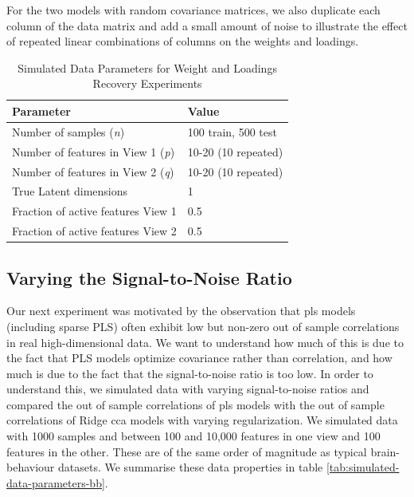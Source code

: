 For the two models with random covariance matrices, we also duplicate each column of the data matrix and add a small amount of noise to illustrate the effect of repeated linear combinations of columns on the weights and \gls{loadings}.

\begin{table}
    \centering
    \caption{Simulated Data Parameters for Weight and Loadings Recovery Experiments}
    \begin{tabular}{| l | l |}
        \hline
        \textbf{Parameter}                        & \textbf{Value}                               \\
        \hline
        Number of samples (\textit{n})            & 100 train, 500 test                            \\
        Number of features in View 1 (\textit{p}) & 10-20 (10 repeated) \\
        Number of features in View 2 (\textit{q}) & 10-20 (10 repeated) \\
        True Latent dimensions                    & 1                                            \\
        Fraction of active features View 1            & 0.5                                          \\
        Fraction of active features View 2            & 0.5                                          \\
        \hline
    \end{tabular}\label{tab:simulated-data-parameters}
\end{table}

\subsection{Varying the Signal-to-Noise Ratio}

Our next experiment was motivated by the observation that \acrshort{pls} models (including sparse PLS) often exhibit low but non-zero out of sample correlations in real high-dimensional data.
We want to understand how much of this is due to the fact that PLS models optimize covariance rather than correlation, and how much is due to the fact that the signal-to-noise ratio is too low.
In order to understand this, we simulated data with varying signal-to-noise ratios and compared the out of sample correlations of \acrshort{pls} models with the out of sample correlations of Ridge \acrshort{cca} models with varying regularization.
We simulated data with 1000 samples and between 100 and 10,000 features in one view and 100 features in the other.
These are of the same order of magnitude as typical brain-behaviour datasets.
We summarise these data properties in table \ref{tab:simulated-data-parameters-bb}.

